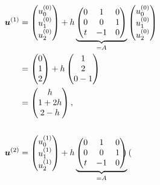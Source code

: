 \documentclass[12pt]{article}
\begin{document}
\begin{enumerate}[i)]
\begin{align}
{\begin{aligned}
				      \phantom{a}                              \\
				      {\boldsymbol{\mathnormal u}}^{(1)} & =
				      \begin{pmatrix}
					      u_0^{(0)} \\u_1^{(0)} \\u_2^{(0)}
				      \end{pmatrix}
				      +h
				      \underbrace{
					      \begin{pmatrix}
						      0 & 1 & 0 \\ 0 & 0 & 1 \\ t & -1 & 0
					      \end{pmatrix}
				      }_{=A}
				      \begin{pmatrix}
					      u_0^{(0)} \\u_1^{(0)} \\u_2^{(0)}
				      \end{pmatrix}
				      \\
				                & =
				      \begin{pmatrix}
					      0 \\1\\2
				      \end{pmatrix}
				      +h\begin{pmatrix}
					      1 \\2\\0-1
				      \end{pmatrix}
				      \\
				                & =\begin{pmatrix}
					      h \\1+2h\\2-h
				      \end{pmatrix}, \\
				      \phantom{a}                              \\
				      {\boldsymbol{\mathnormal u}}^{(2)} & =
				      \begin{pmatrix}
					      u_0^{(1)} \\u_1^{(1)} \\u_2^{(1)}
				      \end{pmatrix}
				      +h
				      \underbrace{
					      \begin{pmatrix}
						      0 & 1 & 0 \\ 0 & 0 & 1 \\ t & -1 & 0
					      \end{pmatrix}
				      }_{=A}
				      \begin{pmatrix}

\end{pmatrix}
\end{aligned}}
\end{align}
\end{enumerate}
\end{document}
